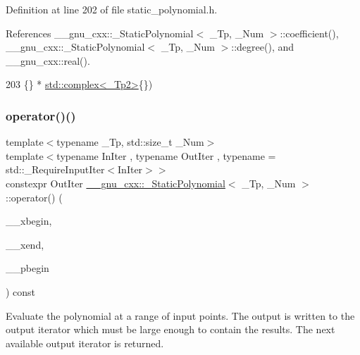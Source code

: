 Definition at line 202 of file static\+\_\+polynomial.\+h.



References \+\_\+\+\_\+gnu\+\_\+cxx\+::\+\_\+\+Static\+Polynomial$<$ \+\_\+\+Tp, \+\_\+\+Num $>$\+::coefficient(), \+\_\+\+\_\+gnu\+\_\+cxx\+::\+\_\+\+Static\+Polynomial$<$ \+\_\+\+Tp, \+\_\+\+Num $>$\+::degree(), and \+\_\+\+\_\+gnu\+\_\+cxx\+::real().


\begin{DoxyCode}
203                               \{\} * \hyperlink{classstd_1_1complex}{std::complex<\_Tp2>}\{\})
\end{DoxyCode}
\mbox{\label{class____gnu__cxx_1_1__StaticPolynomial_a5349b0a6fb07adb587948d060387b871}} 
\subsubsection{\texorpdfstring{operator()()}{operator()()}\hspace{0.1cm}{\footnotesize\ttfamily [4/4]}}
{\footnotesize\ttfamily template$<$typename \+\_\+\+Tp, std\+::size\+\_\+t \+\_\+\+Num$>$ \\
template$<$typename In\+Iter , typename Out\+Iter , typename  = std\+::\+\_\+\+Require\+Input\+Iter$<$\+In\+Iter$>$$>$ \\
constexpr Out\+Iter \hyperlink{class____gnu__cxx_1_1__StaticPolynomial}{\+\_\+\+\_\+gnu\+\_\+cxx\+::\+\_\+\+Static\+Polynomial}$<$ \+\_\+\+Tp, \+\_\+\+Num $>$\+::operator() (\begin{DoxyParamCaption}\item[{const In\+Iter \&}]{\+\_\+\+\_\+xbegin,  }\item[{const In\+Iter \&}]{\+\_\+\+\_\+xend,  }\item[{Out\+Iter \&}]{\+\_\+\+\_\+pbegin }\end{DoxyParamCaption}) const\hspace{0.3cm}{\ttfamily [inline]}}

Evaluate the polynomial at a range of input points. The output is written to the output iterator which must be large enough to contain the results. The next available output iterator is returned. 

